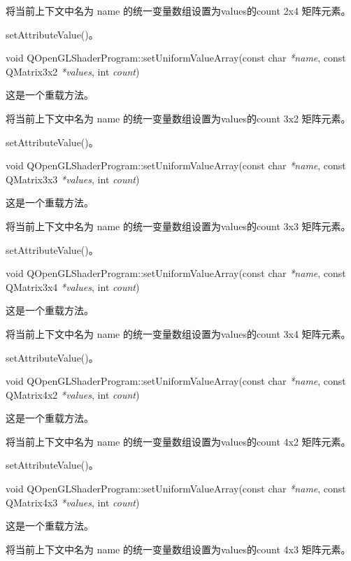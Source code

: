 将当前上下文中名为 name 的统一变量数组设置为values的count 2x4 矩阵元素。

\begin{seeAlso}
setAttributeValue()。
\end{seeAlso}

void QOpenGLShaderProgram::setUniformValueArray(const char \emph{*name}, const QMatrix3x2 \emph{*values}, int \emph{count})

这是一个重载方法。

将当前上下文中名为 name 的统一变量数组设置为values的count 3x2 矩阵元素。

\begin{seeAlso}
setAttributeValue()。
\end{seeAlso}

void QOpenGLShaderProgram::setUniformValueArray(const char \emph{*name}, const QMatrix3x3 \emph{*values}, int \emph{count})

这是一个重载方法。

将当前上下文中名为 name 的统一变量数组设置为values的count 3x3 矩阵元素。

\begin{seeAlso}
setAttributeValue()。
\end{seeAlso}

void QOpenGLShaderProgram::setUniformValueArray(const char \emph{*name}, const QMatrix3x4 \emph{*values}, int \emph{count})

这是一个重载方法。

将当前上下文中名为 name 的统一变量数组设置为values的count 3x4 矩阵元素。

\begin{seeAlso}
setAttributeValue()。
\end{seeAlso}

void QOpenGLShaderProgram::setUniformValueArray(const char \emph{*name}, const QMatrix4x2 \emph{*values}, int \emph{count})

这是一个重载方法。

将当前上下文中名为 name 的统一变量数组设置为values的count 4x2 矩阵元素。

\begin{seeAlso}
setAttributeValue()。
\end{seeAlso}

void QOpenGLShaderProgram::setUniformValueArray(const char \emph{*name}, const QMatrix4x3 \emph{*values}, int \emph{count})

这是一个重载方法。

将当前上下文中名为 name 的统一变量数组设置为values的count 4x3 矩阵元素。

